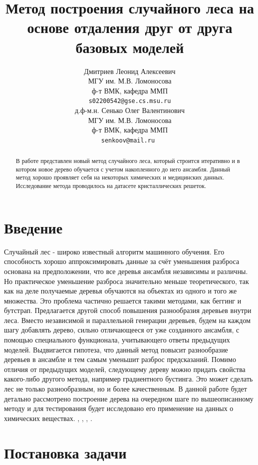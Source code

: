 \documentclass{article}
\title{Метод построения случайного леса на основе отдаления друг от друга базовых моделей}
\author{ Дмитриев Леонид Алексеевич  \\
	МГУ им. М.В. Ломоносова\\
	ф-т ВМК, кафедра ММП\\
	\texttt{s02200542@gse.cs.msu.ru} \\
	\And
	д.ф-м.н. Сенько Олег Валентинович \\
	МГУ им. М.В. Ломоносова\\
	ф-т ВМК, кафедра ММП\\
	\texttt{senkoov@mail.ru } \\
}
\date{}
\begin{document}
\maketitle

\begin{abstract}
	В работе представлен новый метод случайного леса, который строится итеративно и в котором новое дерево обучается с учетом накопленного до него ансамбля. Данный метод хорошо проявляет себя на некоторых химических и медицинских данных. Исследование метода проводилось на датасете кристаллических решеток.
\end{abstract}



\section{Введение}

Случайный лес - широко известный алгоритм машинного обучения.
Его способность хорошо аппроксимировать данные за счёт
уменьшения разброса основана на предположении, что все деревья
ансамбля независимы и различны. Но практическое уменьшение
разброса значительно меньше теоретического, так как на деле
получаемые деревья обучаются на объектах из одного и того же
множества. Это проблема частично решается такими методами, как
беггинг и бутстрап.
Предлагается другой способ повышения разнообразия деревьев
внутри леса. Вместо независимой и параллельной генерации деревьев,
будем на каждом шагу добавлять дерево, сильно отличающееся от уже
созданного ансамбля, с помощью специального функционала,
учитывающего ответы предыдущих моделей. Выдвигается гипотеза,
что данный метод повысит разнообразие деревьев в ансамбле и тем
самым уменьшит разброс предсказаний.
Помимо отличия от предыдущих моделей, следующему дереву можно
придать свойства какого-либо другого метода, например градиентного
бустинга. Это может сделать лес не только разнообразным, но и более
качественным.
В данной работе будет детально рассмотрено построение дерева на
очередном шаге по вышеописанному методу и для тестирования будет
исследовано его применение на данных о химических веществах.
\citep{bibref1}, \citep{bibref2}, \citep{Ren_2015_CVPR}, \citep{bibrel3}.

\section{Постановка задачи}
\label{sec:headings}
\end{document}
